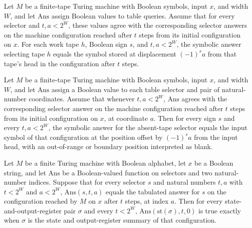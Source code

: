 \begin{theorem}
\label{Complexity.Meyer.sv_true_some}
\leanok
{}
Let $M$ be a finite-tape Turing machine with Boolean symbols, input $x$, and width $W$,
and let $\mathrm{Ans}$ assign Boolean values to table queries. Assume that for every
selector and $t,a<2^W$, these values agree with the corresponding selector answers on
the machine configuration reached after $t$ steps from its initial configuration on $x$.
For each work tape $h$, Boolean sign $s$, and $t,a<2^W$, the symbolic answer selecting
tape $h$ equals the symbol stored at displacement $(-1)^s a$ from that tape's head in
the configuration after $t$ steps.
\end{theorem}

\begin{theorem}
\label{Complexity.Meyer.sv_true_none}
\leanok
{}
Let $M$ be a finite-tape Turing machine with Boolean symbols, input $x$, and width $W$,
and let $\mathrm{Ans}$ assign a Boolean value to each table selector and pair of
natural-number coordinates. Assume that whenever $t,a<2^W$, $\mathrm{Ans}$ agrees with
the corresponding selector answer on the machine configuration reached after $t$ steps
from its initial configuration on $x$, at coordinate $a$. Then for every sign $s$ and
every $t,a<2^W$, the symbolic answer for the absent-tape selector equals the input
symbol of that configuration at the position offset by $(-1)^s a$ from the input head,
with an out-of-range or boundary position interpreted as blank.
\end{theorem}

\begin{theorem}
\label{Complexity.Meyer.st_true}
\leanok
{}
Let $M$ be a finite Turing machine with Boolean alphabet, let $x$ be a Boolean string,
and let $\mathrm{Ans}$ be a Boolean-valued function on selectors and two natural-number
indices. Suppose that for every selector $s$ and natural numbers $t,a$ with $t<2^W$ and
$a<2^W$, $\mathrm{Ans}(s,t,a)$ equals the tabulated answer for $s$ on the configuration
reached by $M$ on $x$ after $t$ steps, at index $a$. Then for every
state-and-output-register pair $\sigma$ and every $t<2^W$,
$\mathrm{Ans}(\mathrm{st}(\sigma),t,0)$ is true exactly when $\sigma$ is the state and
output-register summary of that configuration.
\end{theorem}

